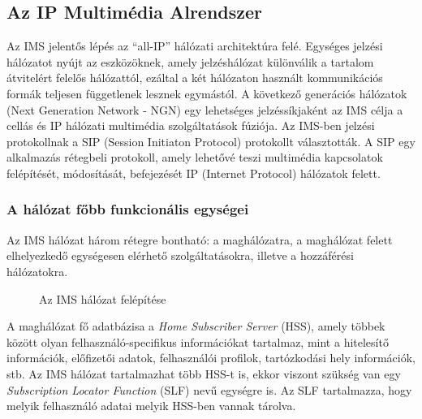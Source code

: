 \subsection{Az IP Multimédia Alrendszer}
\label{sec:ims}

Az IMS jelentős lépés az ``all-IP'' hálózati architektúra felé. Egységes jelzési hálózatot nyújt az eszközöknek, amely jelzéshálózat különválik a tartalom átvitelért felelős hálózattól, ezáltal a két hálózaton használt kommunikációs formák teljesen függetlenek lesznek egymástól. A következő generációs hálózatok (Next Generation Network - NGN) egy lehetséges jelzéssíkjaként az IMS célja a cellás és IP hálózati multimédia szolgáltatások fúziója. Az IMS-ben jelzési protokollnak a  SIP (Session Initiaton Protocol) protokollt választották. A SIP egy alkalmazás rétegbeli protokoll, amely lehetővé teszi multimédia kapcsolatok felépítését, módosítását, befejezését IP (Internet Protocol) hálózatok felett. 

\subsubsection{A hálózat főbb funkcionális egységei}

Az IMS hálózat három rétegre bontható: a maghálózatra, a maghálózat felett elhelyezkedő egységesen elérhető szolgáltatásokra, illetve a hozzáférési hálózatokra.

\begin{figure}[htbp]
\center
{}
\caption{Az IMS hálózat felépítése~\cite{ims_figure} }
\label{fig:model}
\end{figure}


A maghálózat fő adatbázisa a \emph{Home Subscriber Server} (HSS), amely többek között olyan felhasználó-specifikus információkat tartalmaz, mint a hitelesítő információk, előfizetői adatok, felhasználói profilok, tartózkodási hely információk, stb. Az IMS hálózat tartalmazhat több HSS-t is, ekkor viszont szükség van egy \emph{Subscription Locator Function} (SLF) nevű egységre is. Az SLF tartalmazza, hogy melyik felhasználó adatai melyik HSS-ben vannak tárolva.

